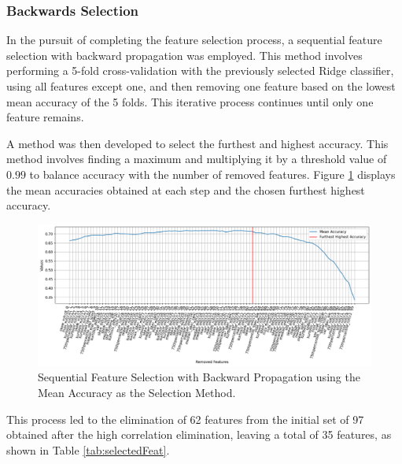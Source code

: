 \subsubsection{Backwards Selection}

In the pursuit of completing the feature selection process, a sequential feature selection with backward propagation was employed. This method involves performing a 5-fold cross-validation with the previously selected Ridge classifier, using all features except one, and then removing one feature based on the lowest mean accuracy of the 5 folds. This iterative process continues until only one feature remains.

A method was then developed to select the furthest and highest accuracy. This method involves finding a maximum and multiplying it by a threshold value of $0.99$ to balance accuracy with the number of removed features. Figure \ref{fig:backProp1} displays the mean accuracies obtained at each step and the chosen furthest highest accuracy.

\begin{figure}[H]
	\centering
	\includegraphics[width=1\linewidth]{figs/4_1_traditional/backProp1.png}
	\caption{Sequential Feature Selection with Backward Propagation using the Mean Accuracy as the Selection Method.}
	\label{fig:backProp1}
\end{figure}

This process led to the elimination of 62 features from the initial set of 97 obtained after the high correlation elimination, leaving a total of 35 features, as shown in Table \ref{tab:selectedFeat}.

